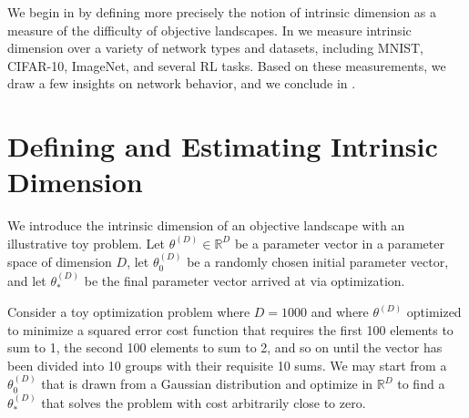 \documentclass{article} %
\newcommand{\thetaD}{\theta^{(D)}}
\newcommand{\thetaDo}{\theta^{(D)}_0}
\newcommand{\thetaDs}{\theta^{(D)}_*}
\begin{document}
We begin in  by defining more precisely the notion of intrinsic dimension as a measure of the difficulty of objective landscapes. In  we measure intrinsic dimension over a variety
of network types and datasets, including MNIST, CIFAR-10, ImageNet, and several RL tasks. Based
on these measurements, we draw a few insights on network behavior, and we conclude in .
 
%
%
%




\section{Defining and Estimating Intrinsic Dimension}

We introduce the intrinsic dimension of an objective landscape with an illustrative toy problem.
Let $\thetaD \in \mathbb{R}^D$ be a parameter vector in a parameter space of dimension $D$, let $\thetaDo$ be a randomly chosen initial parameter vector, and
let $\thetaDs$ be the final parameter vector arrived at via optimization.

Consider a toy optimization problem where $D=1000$ %
and where $\thetaD$ optimized to minimize a squared error cost function that requires the first 100 elements to sum to 1, the second 100 elements to sum to 2, and so on until the vector has been divided into 10 groups with their requisite 10 sums.
%
We may start from a $\thetaDo$ that is drawn from a Gaussian distribution and optimize in $\mathbb{R}^D$ to find a $\thetaDs$ that solves the problem with cost arbitrarily close to zero.
\end{document}
